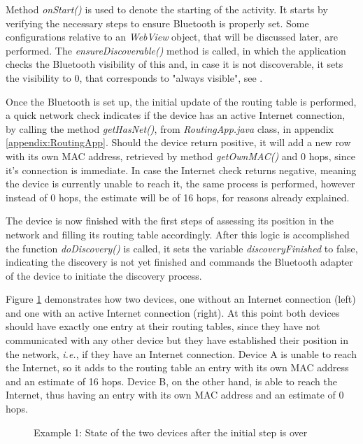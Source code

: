Method \textit{onStart()} is used to denote the starting of the activity. It  starts by verifying the necessary steps to ensure Bluetooth is properly set. Some configurations relative to an \textit{WebView} object, that will be discussed later, are performed. The \textit{ensureDiscoverable()} method is called, in which the application checks the Bluetooth visibility of this and, in case it is not discoverable, it sets the visibility to 0, that corresponds to "always visible", see \cite{btandroid}.

Once the Bluetooth is set up, the initial update of the routing table is performed, a quick network check indicates if the device has an active Internet connection, by calling the method \textit{getHasNet()}, from \textit{RoutingApp.java} class, in appendix \ref{appendix:RoutingApp}. Should the device return positive, it will add a new row with its own \gls{MAC} address, retrieved by method \textit{getOwnMAC()} and 0 hops, since it's connection is immediate. In case the Internet check returns negative, meaning the device is currently unable to reach it, the same process is performed, however instead of 0 hops, the estimate will be of 16 hops, for reasons already explained.

The device is now finished with the first steps of assessing its position in the network and filling its routing table accordingly. After this logic is accomplished the function \textit{doDiscovery()} is called, it sets the variable \textit{discoveryFinished} to false, indicating the discovery is not yet finished and commands the Bluetooth adapter of the device to initiate the discovery process.

Figure \ref{fig:adveg1} demonstrates how two devices, one without an Internet connection (left) and one with an active Internet connection (right). At this point both devices should have exactly one entry at their routing tables, since they have not communicated with any other device but they have established their position in the network, \textit{i.e.}, if they have an Internet connection. Device A is unable to reach the Internet, so it adds to the routing table an entry with its own \gls{MAC} address and an estimate of 16 hops. Device B, on the other hand, is able to reach the Internet, thus having an entry with its own \gls{MAC} address and an estimate of 0 hops.

\begin{figure}[ht]
   \noindent{}
	\caption{\label{fig:adveg1} Example 1: State of the two devices after the initial step is over}
\end{figure}

